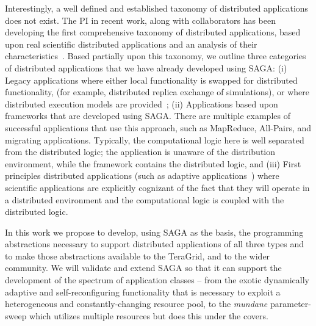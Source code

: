 \documentclass[10pt,letterpaper]{article}
\begin{document}
Interestingly, a well defined and established
taxonomy of distributed applications does not exist. The PI in recent work, along
with collaborators has been developing the first comprehensive
taxonomy of distributed applications, based upon real scientific
distributed applications and an analysis of their
characteristics~\cite{dpa-paper, dpa-wiki}.  Based partially upon this
taxonomy, we outline three categories of distributed applications that
we have already developed using SAGA: (i) Legacy applications where
either local functionality is swapped for distributed functionality,
(for example, distributed replica exchange of simulations), or where
distributed execution models are provided~\cite{saga_tg08}; (ii)
Applications based upon frameworks that are developed using
SAGA. There are multiple examples of successful applications that use
this approach, such as MapReduce, All-Pairs, and migrating
applications. Typically, the computational logic here is well
separated from the distributed logic; the application is unaware of
the distribution environment, while the framework contains the
distributed logic, and (iii) First principles distributed applications
(such as adaptive applications~\cite{saga_escience07}) where
scientific applications are explicitly cognizant of the fact that they
will operate in a distributed environment and the computational logic
is coupled with the distributed logic.

In this work we propose to develop, using SAGA as the basis, the
programming abstractions necessary to support distributed applications
of all three types and to make those abstractions available to the
TeraGrid, and to the wider community.  We will validate and extend
SAGA so that it can support the development of the spectrum of
application classes -- from the exotic dynamically adaptive and
self-reconfiguring functionality that is necessary to exploit a
heterogeneous and constantly-changing resource pool, to the {\it
  mundane} parameter-sweep which utilizes multiple resources but does
this under the covers.  

\end{document}
